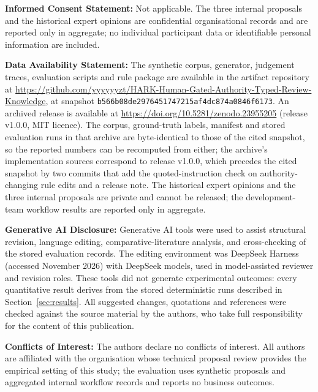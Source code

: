 \documentclass[computers,article,submit,moreauthors]{Definitions/mdpi}
\begin{document}
\noindent\textbf{Informed Consent Statement:} Not applicable. The three internal proposals and the historical expert opinions are confidential organisational records and are reported only in aggregate; no individual participant data or identifiable personal information are included.

\noindent\textbf{Data Availability Statement:} The synthetic corpus, generator, judgement traces, evaluation scripts and rule package are available in the artifact repository at \url{https://github.com/yyyyyyzt/HARK-Human-Gated-Authority-Typed-Review-Knowledge}, at snapshot \texttt{b566b08de2976451747215af4dc874a0846f6173}. An archived release is available at \href{https://doi.org/10.5281/zenodo.23955205}{https://doi.org/10.5281/zenodo.23955205} (release v1.0.0, MIT licence). The corpus, ground-truth labels, manifest and stored evaluation runs in that archive are byte-identical to those of the cited snapshot, so the reported numbers can be recomputed from either; the archive's implementation sources correspond to release v1.0.0, which precedes the cited snapshot by two commits that add the quoted-instruction check on authority-changing rule edits and a release note. The historical expert opinions and the three internal proposals are private and cannot be released; the development-team workflow results are reported only in aggregate.

\noindent\textbf{Generative AI Disclosure:} Generative AI tools were used to assist structural revision, language editing, comparative-literature analysis, and cross-checking of the stored evaluation records. The editing environment was DeepSeek Harness (accessed November 2026) with DeepSeek models, used in model-assisted reviewer and revision roles. These tools did not generate experimental outcomes: every quantitative result derives from the stored deterministic runs described in Section~\ref{sec:results}. All suggested changes, quotations and references were checked against the source material by the authors, who take full responsibility for the content of this publication.

\noindent\textbf{Conflicts of Interest:} The authors declare no conflicts of interest. All authors are affiliated with the organisation whose technical proposal review provides the empirical setting of this study; the evaluation uses synthetic proposals and aggregated internal workflow records and reports no business outcomes.

\end{document}
